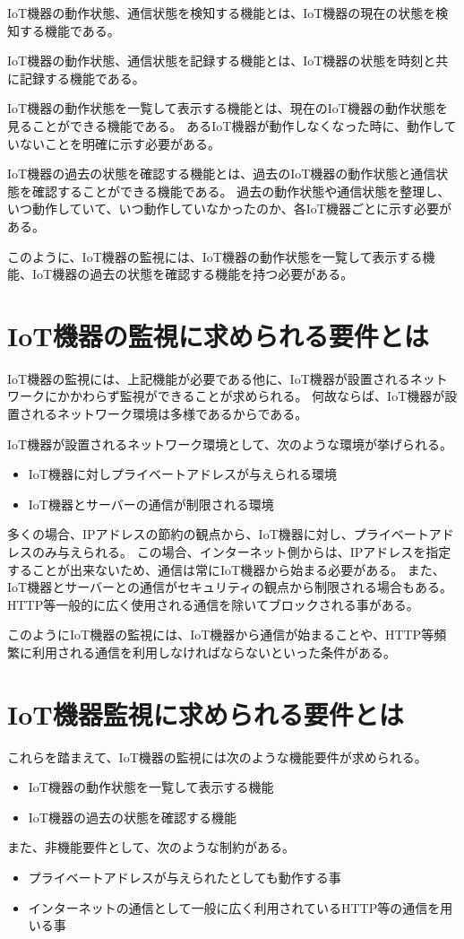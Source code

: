 IoT機器の動作状態、通信状態を検知する機能とは、IoT機器の現在の状態を検知する機能である。

IoT機器の動作状態、通信状態を記録する機能とは、IoT機器の状態を時刻と共に記録する機能である。

IoT機器の動作状態を一覧して表示する機能とは、現在のIoT機器の動作状態を見ることができる機能である。
あるIoT機器が動作しなくなった時に、動作していないことを明確に示す必要がある。
\medskip

IoT機器の過去の状態を確認する機能とは、過去のIoT機器の動作状態と通信状態を確認することができる機能である。
過去の動作状態や通信状態を整理し、いつ動作していて、いつ動作していなかったのか、各IoT機器ごとに示す必要がある。
\medskip

このように、IoT機器の監視には、IoT機器の動作状態を一覧して表示する機能、IoT機器の過去の状態を確認する機能を持つ必要がある。

\section{IoT機器の監視に求められる要件とは}%
IoT機器の監視には、上記機能が必要である他に、IoT機器が設置されるネットワークにかかわらず監視ができることが求められる。
何故ならば、IoT機器が設置されるネットワーク環境は多様であるからである。
\medskip

IoT機器が設置されるネットワーク環境として、次のような環境が挙げられる。
\begin{itemize}
	\item IoT機器に対しプライベートアドレスが与えられる環境
	\item IoT機器とサーバーの通信が制限される環境
\end{itemize}

多くの場合、IPアドレスの節約の観点から、IoT機器に対し、プライベートアドレスのみ与えられる。
この場合、インターネット側からは、IPアドレスを指定することが出来ないため、通信は常にIoT機器から始まる必要がある。
また、IoT機器とサーバーとの通信がセキュリティの観点から制限される場合もある。
HTTP等一般的に広く使用される通信を除いてブロックされる事がある。
\medskip

このようにIoT機器の監視には、IoT機器から通信が始まることや、HTTP等頻繁に利用される通信を利用しなければならないといった条件がある。

\section{IoT機器監視に求められる要件とは}%
これらを踏まえて、IoT機器の監視には次のような機能要件が求められる。
\begin{itemize}
	\item IoT機器の動作状態を一覧して表示する機能
	\item IoT機器の過去の状態を確認する機能
\end{itemize}
また、非機能要件として、次のような制約がある。
\begin{itemize}
	\item プライベートアドレスが与えられたとしても動作する事
	\item インターネットの通信として一般に広く利用されているHTTP等の通信を用いる事
\end{itemize}
